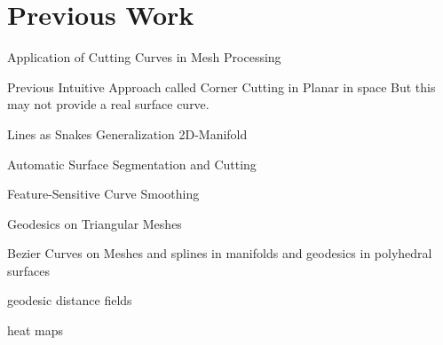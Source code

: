 \documentclass{stdlocal}
\begin{document}
\section{Previous Work} %
\label{sec:previous_work}

  Application of Cutting Curves in Mesh Processing
  \autocite{zachow2003}
  \autocite{benhabiles2011}
  \autocite{ji2006}

  Previous Intuitive Approach called Corner Cutting in Planar
  \autocite{chaikin1974}
  \autocite{dyn1992}
  in space
  \autocite{morera2008}
  But this may not provide a real surface curve.

  Lines as Snakes
  \autocite{kass1988}
  Generalization 2D-Manifold
  \autocite{bischoff2005}
  \autocite{jung2004}

  Automatic Surface Segmentation and Cutting
  \autocite{lee2002}
  \autocite{lee2004}

  Feature-Sensitive Curve Smoothing
  \autocite{lai2007}

  Geodesics on Triangular Meshes
  \autocite{martinez2005}

  Bezier Curves on Meshes
  \autocite{martinez2007}
  and splines in manifolds
  \autocite{hofer2004}
  and geodesics in polyhedral surfaces
  \autocite{polthier2006}
  \autocite{mitchell1987}
  \autocite{surazhsky2005}

  geodesic distance fields
  \autocite{bommes2007}
  \autocite{kimmel1996}

  heat maps
  \autocite{crane2013}

  \autocite{dijkstra1959}

  \autocite{ma2007}
  \autocite{pottmann2005}
  \autocite{levy2002}

  \autocite{mancinelli2022}

  \autocite{yu2021}

  \autocite{engelke2018}

\end{document}
